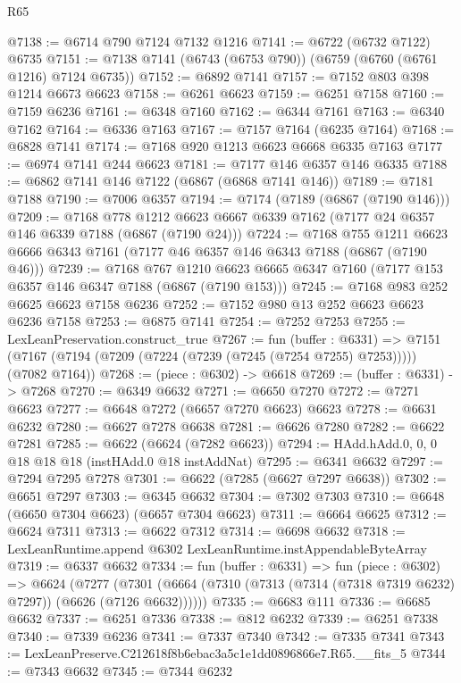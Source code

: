\begin{lexlean}{R65}
\begin{coremodule}
{@7138 := @6714 @790 @7124 @7132 @1216
@7141 := @6722 (@6732 @7122) @6735
@7151 := @7138 @7141 (@6743 (@6753 @790)) (@6759 (@6760 (@6761 @1216) @7124 @6735))
@7152 := @6892 @7141
@7157 := @7152 @803 @398 @1214 @6673 @6623
@7158 := @6261 @6623
@7159 := @6251 @7158
@7160 := @7159 @6236
@7161 := @6348 @7160
@7162 := @6344 @7161
@7163 := @6340 @7162
@7164 := @6336 @7163
@7167 := @7157 @7164 (@6235 @7164)
@7168 := @6828 @7141
@7174 := @7168 @920 @1213 @6623 @6668 @6335 @7163
@7177 := @6974 @7141 @244 @6623
@7181 := @7177 @146 @6357 @146 @6335
@7188 := @6862 @7141 @146 @7122 (@6867 (@6868 @7141 @146))
@7189 := @7181 @7188
@7190 := @7006 @6357
@7194 := @7174 (@7189 (@6867 (@7190 @146)))
@7209 := @7168
    @778
    @1212
    @6623
    @6667
    @6339
    @7162
    (@7177 @24 @6357 @146 @6339 @7188 (@6867 (@7190 @24)))
@7224 := @7168
    @755
    @1211
    @6623
    @6666
    @6343
    @7161
    (@7177 @46 @6357 @146 @6343 @7188 (@6867 (@7190 @46)))
@7239 := @7168
    @767
    @1210
    @6623
    @6665
    @6347
    @7160
    (@7177 @153 @6357 @146 @6347 @7188 (@6867 (@7190 @153)))
@7245 := @7168 @983 @252 @6625 @6623 @7158 @6236
@7252 := @7152 @980 @13 @252 @6623 @6623 @6236 @7158
@7253 := @6875 @7141
@7254 := @7252 @7253
@7255 := LexLeanPreservation.construct_true
@7267 := fun (buffer : @6331) =>
  @7151 (@7167 (@7194 (@7209 (@7224 (@7239 (@7245 (@7254 @7255) @7253))))) (@7082 @7164))
@7268 := (piece : @6302) -> @6618
@7269 := (buffer : @6331) -> @7268
@7270 := @6349 @6632
@7271 := @6650 @7270
@7272 := @7271 @6623
@7277 := @6648 @7272 (@6657 @7270 @6623) @6623
@7278 := @6631 @6232
@7280 := @6627 @7278 @6638
@7281 := @6626 @7280
@7282 := @6622 @7281
@7285 := @6622 (@6624 (@7282 @6623))
@7294 := HAdd.hAdd.{0, 0, 0} @18 @18 @18 (instHAdd.{0} @18 instAddNat)
@7295 := @6341 @6632
@7297 := @7294 @7295 @7278
@7301 := @6622 (@7285 (@6627 @7297 @6638))
@7302 := @6651 @7297
@7303 := @6345 @6632
@7304 := @7302 @7303
@7310 := @6648 (@6650 @7304 @6623) (@6657 @7304 @6623)
@7311 := @6664 @6625
@7312 := @6624 @7311
@7313 := @6622 @7312
@7314 := @6698 @6632
@7318 := LexLeanRuntime.append @6302 LexLeanRuntime.instAppendableByteArray
@7319 := @6337 @6632
@7334 := fun (buffer : @6331) =>
  fun (piece : @6302) =>
  @6624
    (@7277 (@7301 (@6664 (@7310 (@7313 (@7314 (@7318 @7319 @6232) @7297)) (@6626 (@7126 @6632))))))
@7335 := @6683 @111
@7336 := @6685 @6632
@7337 := @6251 @7336
@7338 := @812 @6232
@7339 := @6251 @7338
@7340 := @7339 @6236
@7341 := @7337 @7340
@7342 := @7335 @7341
@7343 := LexLeanPreserve.C212618f8b6ebac3a5c1e1dd0896866e7.R65.__fits_5
@7344 := @7343 @6632
@7345 := @7344 @6232
}
\end{coremodule}
\end{lexlean}
